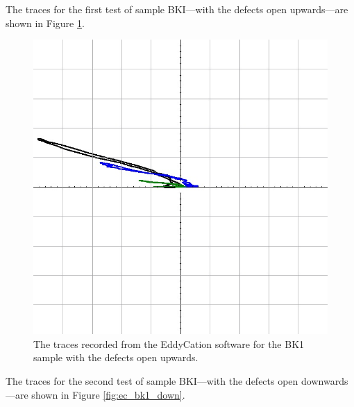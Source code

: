 \documentclass[12 pt]{report}
\begin{document}
The traces for the first test of sample BKI---with the defects open upwards---are shown in Figure \ref{fig:ec_bk1_up}.

\begin{figure}[htbp]
	\centering
	\includegraphics[width=6in]{images/graphs/eddy current testing/S4G2BK1-Upward}
	\caption{The traces recorded from the EddyCation software for the BK1 sample with the defects open upwards.}
	\label{fig:ec_bk1_up}
\end{figure}

The traces for the second test of sample BKI---with the defects open downwards---are shown in Figure \ref{fig:ec_bk1_down}.
\end{document}
